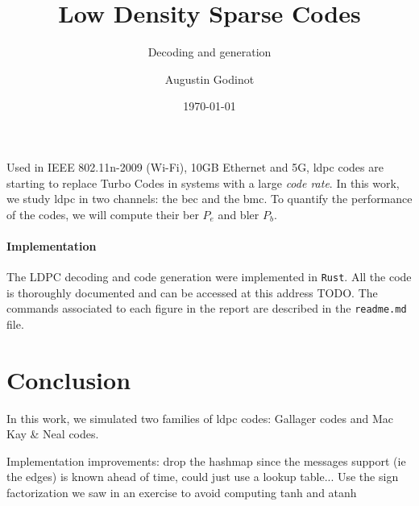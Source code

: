 \documentclass[a4paper]{color-report}
\title{Low Density Sparse Codes}
\author{Augustin Godinot}
\date{\today}
\subtitle{Decoding and generation}
\begin{document}
\maketitle
\tableofcontents
\printglossary[type=\acronymtype, title=Acronyms]
\newpage

Used in IEEE 802.11n-2009 (Wi-Fi), 10GB Ethernet and 5G, \acrshort{ldpc} codes
are starting to replace Turbo Codes in systems with a large \textit{code rate}.
In this work, we study \acrfull{ldpc} in two channels: the \acrfull{bec} and the
\acrfull{bmc}. To quantify the performance of the codes, we will compute their
\acrfull{ber} $P_e$ and \acrfull{bler} $P_b$.

\paragraph{Implementation} The LDPC decoding and code generation were
implemented in \texttt{Rust}. All the code is thoroughly documented and can be
accessed at this address TODO. The commands associated to each figure in the
report are described in the \texttt{readme.md} file.





\section*{Conclusion}
In this work, we simulated two families of \acrshort{ldpc} codes: Gallager codes
and Mac Kay \& Neal codes.

Implementation improvements: drop the hashmap since the messages support (ie the
edges) is known ahead of time, could just use a lookup table...
Use the sign factorization we saw in an exercise to avoid computing tanh and atanh

\end{document}
